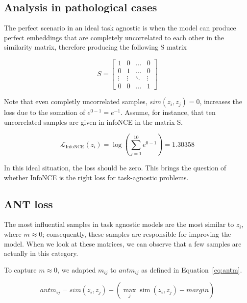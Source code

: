 \documentclass[letterpaper]{article} %
\begin{document}
\subsection{Analysis in pathological cases}

The perfect scenario in an ideal task agnostic is when the model can produce perfect embeddings that are completely uncorrelated to each other in the similarity matrix, therefore producing the following S matrix


\begin{equation}
S = 
\begin{bmatrix}
1 & 0 & \dots & 0 \\
0 & 1 & \dots & 0 \\
\vdots & \vdots & \ddots & \vdots \\
0 & 0 & \dots & 1
\end{bmatrix}
\end{equation}

Note that even completly uncorrelated samples, $sim(z_i,z_j) = 0$, increases the loss due to the somation of $e^{0-1}=e^{-1}$. Assume, for instance, that ten uncorrelated samples are given in infoNCE in the matrix S. 


\begin{equation}\label{eq:example}
\mathcal{L}_{\text{InfoNCE}} (z_i) =  \log \left( \sum_{j=1}^{10} e^{0-1} \right) = 1.30358
\end{equation}

In this ideal situation, the loss should be zero. This brings the question of whether InfoNCE is the right loss for task-agnostic problems. 


\subsection{ANT loss}


The most influential samples in task agnostic models are the most similar to $z_i$, where $m \approx 0$; consequently, these samples are responsible for improving the model. When we look at these matrices, we can observe that a few samples are actually in this category. 

To capture $m \approx 0$, we adapted $m_{ij}$ to $antm_{ij}$ as defined in Equation~\ref{eq:antm}.

\begin{equation}\label{eq:antm}
antm_{ij}  =  sim(z_i,z_j) - (\max_{j} \operatorname{sim}(z_i, z_j) - margin )
\end{equation}
\end{document}
